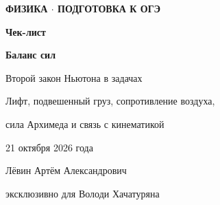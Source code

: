 \documentclass[a4paper,12pt]{article}
\begin{document}
\thispagestyle{empty}
\begin{center}
\vspace*{35mm}
{\small\bfseries\color{accent}ФИЗИКА \(\cdot\) ПОДГОТОВКА К ОГЭ}\par
\vspace{17mm}
{\Huge\bfseries\color{darkaccent}Чек-лист}\par
\vspace{9mm}
{\LARGE\bfseries Баланс сил}\par
\vspace{3mm}
{\Large Второй закон Ньютона в задачах}\par
\vspace{10mm}
{\normalsize\color{textgray}Лифт, подвешенный груз, сопротивление воздуха,}\par
{\normalsize\color{textgray}сила Архимеда и связь с кинематикой}\par
\vspace{18mm}
{\large 21 октября 2026 года}\par
\vfill
{\normalsize\color{textgray}Лёвин Артём Александрович}\par
{\normalsize\color{textgray}эксклюзивно для Володи Хачатуряна}\par
\vspace{22mm}
\end{center}
\clearpage
\end{document}
